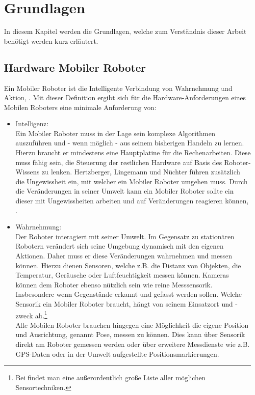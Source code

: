 \documentclass[twoside,11pt, a4paper]{report}
\begin{document}
	\chapter{Grundlagen}
	In diesem Kapitel werden die Grundlagen, welche zum Verständnis dieser Arbeit benötigt werden kurz erläutert.
	
	\section{Hardware Mobiler Roboter}

	Ein Mobiler Roboter ist die Intelligente Verbindung von Wahrnehmung und Aktion, \cite{McKerrow1991}. Mit dieser Definition ergibt sich für die Hardware-Anforderungen eines Mobilen Roboters eine minimale Anforderung von: 
	\begin{itemize}
		\item Intelligenz: \\
		Ein Mobiler Roboter muss in der Lage sein komplexe Algorithmen auszuführen und - wenn möglich - aus seinem bisherigen Handeln zu lernen. Hierzu braucht er mindestens eine Hauptplatine für die Rechenarbeiten. Diese muss fähig sein, die Steuerung der restlichen Hardware auf Basis des Roboter-Wissens zu lenken. Hertzberger, Lingemann und Nüchter führen zusätzlich die Ungewissheit ein, mit welcher ein Mobiler Roboter umgehen muss. Durch die Veränderungen in seiner Umwelt kann ein Mobiler Roboter sollte ein dieser mit Ungewissheiten arbeiten und auf Veränderungen reagieren können, \cite{HeLiNue2012}.
		\item Wahrnehmung: \\
		Der Roboter interagiert mit seiner Umwelt. Im Gegensatz zu stationären Robotern verändert sich seine Umgebung dynamisch mit den eigenen Aktionen. Daher muss er diese Veränderungen wahrnehmen und messen können. Hierzu dienen Sensoren, welche z.B. die Distanz von Objekten, die Temperatur, Geräusche oder Luftfeuchtigkeit messen können. Kameras können dem Roboter ebenso nützlich sein wie reine Messsensorik. Insbesondere wenn Gegenstände erkannt und gefasst werden sollen. Welche Sensorik ein Mobiler Roboter braucht, hängt von seinem Einsatzort und -zweck ab.\footnote{Bei \cite{Hering2012} findet man eine außerordentlich große Liste aller möglichen Sensortechniken.} \\
		Alle Mobilen Roboter brauchen hingegen eine Möglichkeit die eigene Position und Ausrichtung, genannt Pose, messen zu können. Dies kann über Sensorik direkt am Roboter gemessen werden oder über erweitere Messdienste wie z.B. GPS-Daten oder in der Umwelt aufgestellte Positionsmarkierungen. 

\end{itemize}
\end{document}
